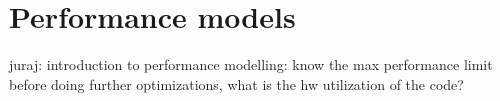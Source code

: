 \chapter{Performance models}

{\color{blue} juraj: introduction to performance modelling: know the max performance limit before doing further optimizations, what is the hw utilization of the code?}

%
%
%
%
%
%
%
